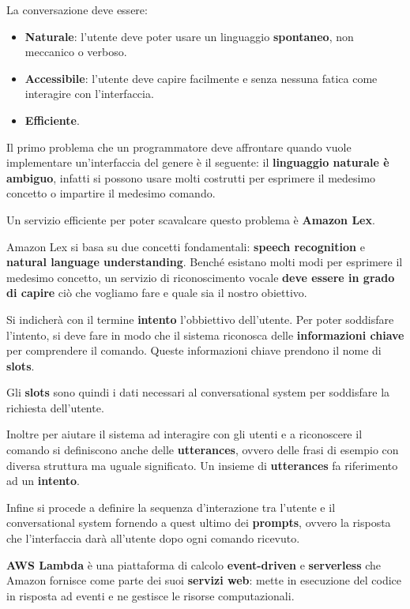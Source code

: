 \documentclass[a4paper,11pt,oneside]{book}
\begin{document}
La conversazione deve essere:
\begin{itemize}
	\item \textbf{Naturale}: l'utente deve poter usare un linguaggio \textbf{spontaneo}, non meccanico o verboso.
	\item \textbf{Accessibile}: l'utente deve capire facilmente e senza nessuna fatica come interagire con l'interfaccia.
	\item \textbf{Efficiente}.
\end{itemize}

Il primo problema che un programmatore deve affrontare quando vuole implementare un'interfaccia del genere è  il seguente: il \textbf{linguaggio naturale è ambiguo}, infatti si possono usare molti costrutti per esprimere il medesimo concetto o impartire il medesimo comando.

Un servizio efficiente per poter scavalcare questo problema è \textbf{Amazon Lex}.

Amazon Lex si basa su due concetti fondamentali: \textbf{speech recognition} e \textbf{natural language understanding}.
Benché esistano molti modi per esprimere il medesimo concetto, un servizio di riconoscimento vocale \textbf{deve essere in grado di capire} ciò che vogliamo fare e quale sia il nostro obiettivo.

Si indicherà con il termine \textbf{intento} l'obbiettivo dell'utente.
Per poter soddisfare l'intento, si deve fare in modo che il sistema riconosca delle \textbf{informazioni chiave} per comprendere il comando. Queste informazioni chiave prendono il nome di \textbf{slots}.

Gli \textbf{slots} sono quindi i dati necessari al conversational system per soddisfare la richiesta dell'utente.

Inoltre per aiutare il sistema ad interagire con gli utenti e a riconoscere il comando si definiscono anche delle \textbf{utterances}, ovvero delle frasi di esempio con diversa struttura ma uguale significato. Un insieme di \textbf{utterances} fa riferimento ad un \textbf{intento}.

Infine si procede a definire la sequenza d'interazione tra l'utente e il conversational system  fornendo a quest ultimo dei \textbf{prompts}, ovvero la risposta che l'interfaccia darà all'utente dopo ogni comando ricevuto.

\pagebreak

\textbf{AWS Lambda} è una piattaforma di calcolo \textbf{event-driven} e \textbf{serverless} che Amazon fornisce come parte dei suoi \textbf{servizi web}: mette in esecuzione del codice in risposta ad eventi e ne gestisce le risorse computazionali.
\end{document}
